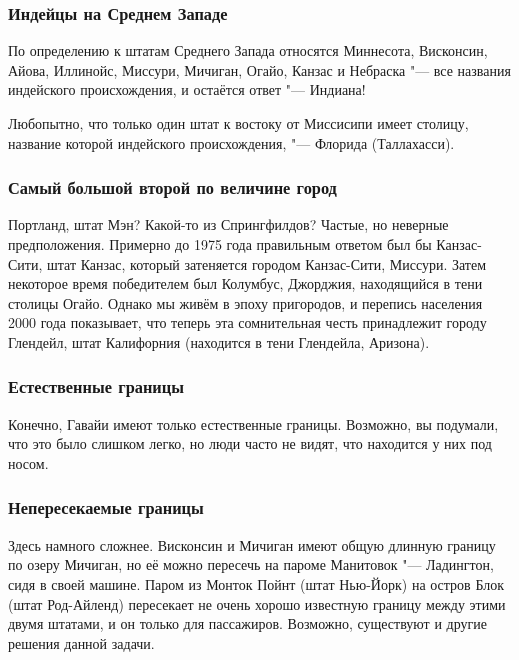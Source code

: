 \documentclass[twoside]{book}
\begin{document}
\subsubsection*{Индейцы на Среднем Западе}%

По определению к штатам Среднего Запада относятся Миннесота, Висконсин, Айова,
Иллинойс, Миссури, Мичиган, Огайо, Канзас и Небраска "--- все названия индейского
происхождения, и остаётся ответ "--- Индиана!\heart

Любопытно, что только один штат к востоку от Миссисипи имеет столицу, название которой индейского происхождения, "--- Флорида (Таллахасси).

\subsubsection*{Самый большой второй по величине город}%

Портланд, штат Мэн? Какой-то из Спрингфилдов? 
Частые, но неверные предположения.
Примерно до 1975 года правильным ответом был бы Канзас-Сити, штат Канзас, который затеняется городом Канзас-Сити, Миссури.
Затем некоторое время победителем был Колумбус, Джорджия, находящийся в тени столицы Огайо.
Однако мы живём в эпоху пригородов, и %
перепись населения 2000 года показывает, что теперь эта сомнительная честь принадлежит городу Глендейл, штат Калифорния (находится в тени Глендейла, Аризона).\heart

\subsubsection*{Естественные границы}%

Конечно, Гавайи имеют только естественные границы.
Возможно, вы подумали, что это было слишком легко, но люди часто не видят, что находится у них под носом.
\heart

\subsubsection*{Непересекаемые границы}%

Здесь намного сложнее.
Висконсин и Мичиган имеют общую длинную границу по озеру Мичиган, но её можно пересечь на пароме Манитовок "--- Ладингтон, сидя в своей машине.
Паром из Монток Пойнт %
(штат Нью-Йорк) на остров Блок %
(штат Род-Айленд) пересекает не очень хорошо известную границу между этими двумя штатами, и он только для пассажиров.
Возможно, существуют и другие решения данной задачи.\heart
                             
\end{document}
